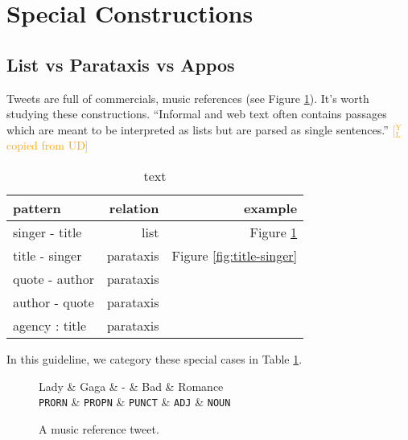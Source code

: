 \documentclass[11pt,a4paper]{article}
\newcommand{\yjcomment}[1]{\textcolor{orange}{[$_\mathrm{L}^\mathrm{Y}$#1]}}
\begin{document}
\section{Special Constructions}

\subsection{List vs Parataxis vs Appos}

Tweets are full of commercials, music references (see Figure \ref{fig:singer-title}).
It's worth studying these constructions.
``Informal and web text often contains passages which are meant to be
interpreted as lists but are parsed as single sentences.'' \yjcomment{copied from UD}

\begin{table}[t]
	\centering
	\begin{tabular}{lrr}
		\hline
		pattern & relation & example \\
		\hline
		singer - title & list & Figure \ref{fig:singer-title} \\
		title - singer & parataxis & Figure \ref{fig:title-singer} \\
		quote - author & parataxis & \\
		author - quote & parataxis & \\
		agency : title & parataxis & \\
		\hline
	\end{tabular}
\caption{text}\label{tbl:list-construct}
\end{table}

In this guideline, we category these special cases in Table \ref{tbl:list-construct}.

\begin{figure}[t]
	\centering
	\small
	\begin{dependency}[edge slant=2, text only label, label style=above]
		\begin{deptext}
			Lady  \& Gaga \& - \& Bad \& Romance \\
			\texttt{PRORN} \& \texttt{PROPN} \& \texttt{PUNCT} \& \texttt{ADJ} \& \texttt{NOUN} \\
		\end{deptext}
	\end{dependency}
	\caption{A music reference tweet.}\label{fig:singer-title}
\end{figure}
\end{document}
